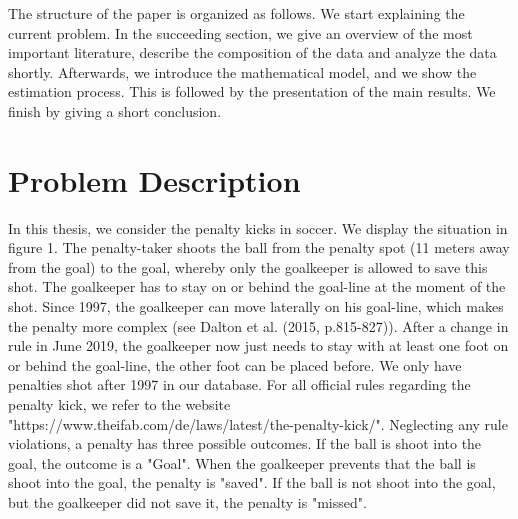 \documentclass[12pt,dvipsnames]{article}%
\begin{document}
The structure of the paper is organized as follows. We start explaining the current problem. In the succeeding section, we give an overview of the most important literature, describe the composition of the data and analyze the data shortly. Afterwards, we introduce the mathematical model, and we show the estimation process. This is followed by the presentation of the main results. We finish by giving a short conclusion.

\vspace{-0.2cm}

\section{Problem Description }

In this thesis, we consider the penalty kicks in soccer. We display the situation in figure 1.  The penalty-taker shoots the ball from the penalty spot (11 meters away from the goal) to the goal, whereby only the goalkeeper is allowed to save this shot. The goalkeeper has to stay on or behind the goal-line at the moment of the shot. Since 1997, the goalkeeper can move laterally on his goal-line, which makes the penalty more complex (see Dalton et al. (2015, p.815-827)). After a change in rule in June 2019, the goalkeeper now just needs to stay with at least one foot on or behind the goal-line, the other foot can be placed before. We only have penalties shot after 1997 in our database. For all official rules regarding the penalty kick, we refer to the website "https://www.theifab.com/de/laws/latest/the-penalty-kick/". Neglecting any rule violations, a penalty has three possible outcomes. If the ball is shoot into the goal, the outcome is a "Goal". When the goalkeeper prevents that the ball is shoot into the goal, the penalty is "saved". If the ball is not shoot into the goal, but the goalkeeper did not save it, the penalty is "missed".  \\

\vspace{-0.5cm}
  
\end{document}
